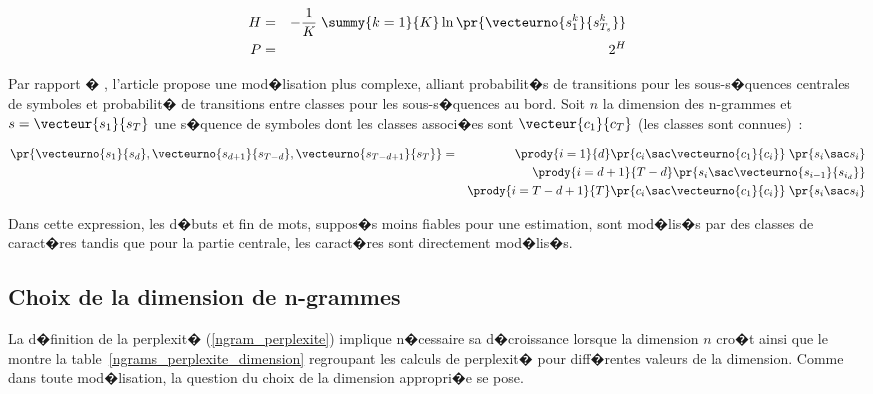                 \begin{eqnarray}
                H &=&  - \frac{1}{K} \; \summy{k=1}{K} \ln \pr{ \vecteurno {s_1^k}{s_{T_s}^k}  } \nonumber\\
                P &=&  2^H  \label{ngram_perplexite}
                \end{eqnarray}

Par rapport � , l'article  propose une mod�lisation plus complexe, alliant probabilit�s de transitions pour les sous-s�quences centrales de symboles et probabilit� de transitions entre classes pour les sous-s�quences au bord. Soit $n$ la dimension des n-grammes et $s = \vecteur{s_1}{s_T}$ une s�quence de symboles dont les classes associ�es sont $\vecteur{c_1}{c_T}$ (les classes sont connues)~:

            \begin{eqnarray*}
                 \pr{  \vecteurno{s_1}{s_d}, \vecteurno{s_{d+1}}{s_{T-d}}, \vecteurno {s_{T-d+1}}{s_T}}  &=&
                 \prody{i=1}{d} \pr { c_i \sac \vecteurno{c_1}{c_i} }  \; \pr{ s_i \sac s_i}  \\
            &&    \prody{i=d+1}{T-d} \pr{ s_i \sac \vecteurno{s_{i-1}}{s_{i_d}} }  \\
            &&    \prody{i=T-d+1}{T} \pr { c_i \sac \vecteurno{c_1}{c_i}  }   \; \pr{ s_i \sac s_i}
            \end{eqnarray*}



Dans cette expression, les d�buts et fin de mots, suppos�s moins fiables pour une estimation, sont mod�lis�s par des classes de caract�res tandis que pour la partie centrale, les caract�res sont directement mod�lis�s.



\subsection{Choix de la dimension de n-grammes}


La d�finition de la perplexit� (\ref{ngram_perplexite}) implique n�cessaire sa d�croissance lorsque la dimension $n$ cro�t ainsi que le montre la table~\ref{ngrams_perplexite_dimension} regroupant les calculs de perplexit� pour diff�rentes valeurs de la dimension. Comme dans toute mod�lisation, la question du choix de la dimension appropri�e se pose.



